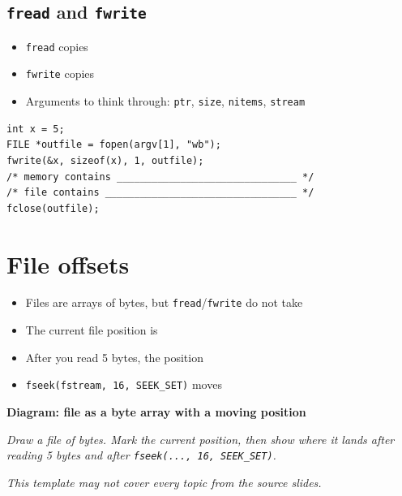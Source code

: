 \documentclass[12pt]{article}
\begin{document}
\subsection{\texttt{fread} and \texttt{fwrite}}
\begin{itemize}[leftmargin=*]
  \item \texttt{fread} copies \hrulefill
  \item \texttt{fwrite} copies \hrulefill
  \item Arguments to think through: \texttt{ptr}, \texttt{size}, \texttt{nitems}, \texttt{stream}
\end{itemize}

\begin{lstlisting}
int x = 5;
FILE *outfile = fopen(argv[1], "wb");
fwrite(&x, sizeof(x), 1, outfile);
/* memory contains _______________________________ */
/* file contains _________________________________ */
fclose(outfile);
\end{lstlisting}

\vspace{1.2em}

\section{File offsets}

\begin{itemize}[leftmargin=*]
  \item Files are arrays of bytes, but \texttt{fread}/\texttt{fwrite} do not take \hrulefill
  \item The current file position is \hrulefill
  \item After you read 5 bytes, the position \hrulefill
  \item \texttt{fseek(fstream, 16, SEEK\_SET)} moves \hrulefill
\end{itemize}

\noindent\textbf{Diagram: file as a byte array with a moving position}
\begin{framed}
\begin{minipage}[t][0.28\textheight]{\textwidth}
\vspace{0.4em}
\textit{Draw a file of bytes. Mark the current position, then show where it lands after reading 5 bytes and after \texttt{fseek(..., 16, SEEK\_SET)}.}
\end{minipage}
\end{framed}

\vspace{2em}
\begin{center}
\textit{This template may not cover every topic from the source slides.}
\end{center}
\end{document}
